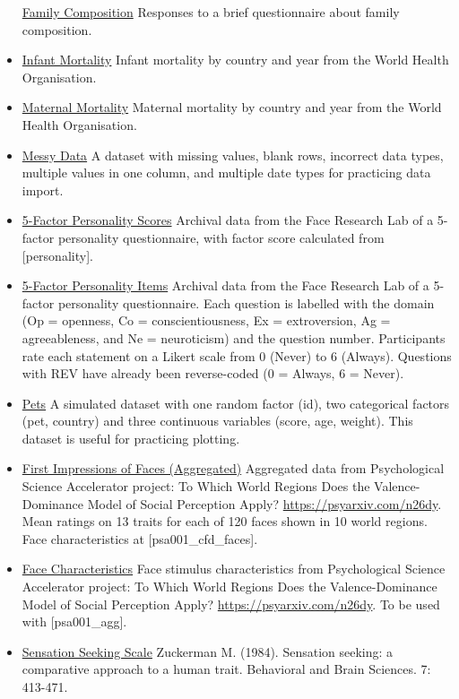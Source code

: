 \documentclass[
  oneside]{book}
\begin{document}
\begin{itemize}
  \href{data/family_composition.csv}{Family Composition} Responses to a brief questionnaire about family composition.
\item
  \href{data/infmort.csv}{Infant Mortality} Infant mortality by country and year from the World Health Organisation.
\item
  \href{data/matmort.xls}{Maternal Mortality} Maternal mortality by country and year from the World Health Organisation.
\item
  \href{data/mess.csv}{Messy Data} A dataset with missing values, blank rows, incorrect data types, multiple values in one column, and multiple date types for practicing data import.
\item
  \href{data/personality_scores.csv}{5-Factor Personality Scores} Archival data from the Face Research Lab of a 5-factor personality questionnaire, with factor score calculated from {[}personality{]}.
\item
  \href{data/personality.csv}{5-Factor Personality Items} Archival data from the Face Research Lab of a 5-factor personality questionnaire. Each question is labelled with the domain (Op = openness, Co = conscientiousness, Ex = extroversion, Ag = agreeableness, and Ne = neuroticism) and the question number. Participants rate each statement on a Likert scale from 0 (Never) to 6 (Always). Questions with REV have already been reverse-coded (0 = Always, 6 = Never).
\item
  \href{data/pets.csv}{Pets} A simulated dataset with one random factor (id), two categorical factors (pet, country) and three continuous variables (score, age, weight). This dataset is useful for practicing plotting.
\item
  \href{data/psa001_agg.csv}{First Impressions of Faces (Aggregated)} Aggregated data from Psychological Science Accelerator project: To Which World Regions Does the Valence-Dominance Model of Social Perception Apply? \url{https://psyarxiv.com/n26dy}. Mean ratings on 13 traits for each of 120 faces shown in 10 world regions. Face characteristics at {[}psa001\_cfd\_faces{]}.
\item
  \href{data/psa001_cfd_faces.csv}{Face Characteristics} Face stimulus characteristics from Psychological Science Accelerator project: To Which World Regions Does the Valence-Dominance Model of Social Perception Apply? \url{https://psyarxiv.com/n26dy}. To be used with {[}psa001\_agg{]}.
\item
  \href{data/sensation_seeking.csv}{Sensation Seeking Scale} Zuckerman M. (1984). Sensation seeking: a comparative approach to a human trait. Behavioral and Brain Sciences. 7: 413-471.

\end{itemize}
\end{document}
